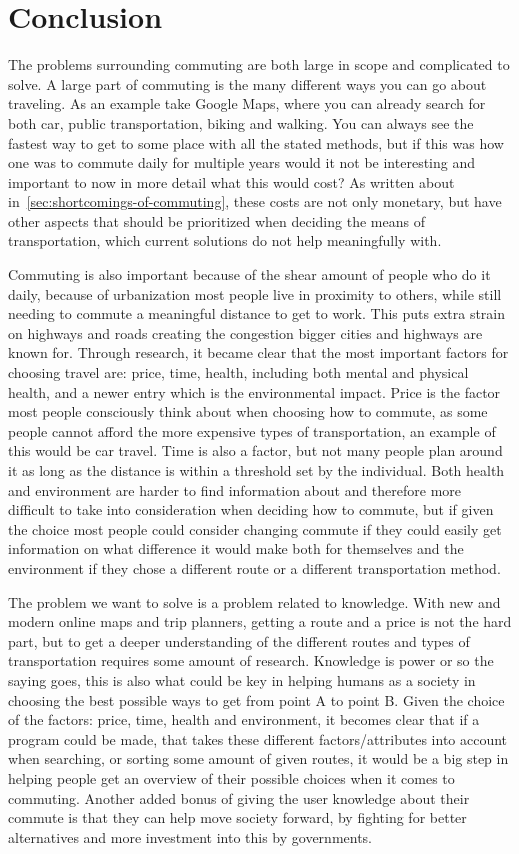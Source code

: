 \chapter{Conclusion}\label{ch:conclusion}
The problems surrounding commuting are both large in scope and complicated to solve.
A large part of commuting is the many different ways you can go about traveling.
As an example take Google Maps, where you can already search for both car, public transportation, biking and walking.
You can always see the fastest way to get to some place with all the stated methods, but if this was how one was to
commute daily for multiple years would it not be interesting and important to now in more detail what this would cost?
As written about in~\ref{sec:shortcomings-of-commuting}, these costs are not only monetary, but have other
aspects that should be prioritized when deciding the means of transportation, which current solutions do not help
meaningfully with.

Commuting is also important because of the shear amount of people who do it daily, because of urbanization most people
live in proximity to others, while still needing to commute a meaningful distance to get to work.
This puts extra strain on highways and roads creating the congestion bigger cities and highways are known for.
Through research, it became clear that the most important factors for choosing travel are: price, time, health,
including both mental and physical health, and a newer entry which is the environmental impact.
Price is the factor most people consciously think about when choosing how to commute, as some people cannot afford the
more expensive types of transportation, an example of this would be car travel.
Time is also a factor, but not many people plan around it as long as the distance is within a threshold set by the
individual.
Both health and environment are harder to find information about and therefore more difficult to take into consideration
when deciding how to commute, but if given the choice most people could consider changing commute if they could easily
get information on what difference it would make both for themselves and the environment if they chose a different route
or a different transportation method.

The problem we want to solve is a problem related to knowledge.
With new and modern online maps and trip planners, getting a route and a price is not the hard part, but to get a deeper
understanding of the different routes and types of transportation requires some amount of research.
Knowledge is power or so the saying goes, this is also what could be key in helping humans as a society in choosing
the best possible ways to get from point A to point B\@.
Given the choice of the factors: price, time, health and environment, it becomes clear that if a program could be made,
that takes these different factors/attributes into account when searching, or sorting some amount of given routes, it
would be a big step in helping people get an overview of their possible choices when it comes to commuting.
Another added bonus of giving the user knowledge about their commute is that they can help move society forward, by
fighting for better alternatives and more investment into this by governments.
